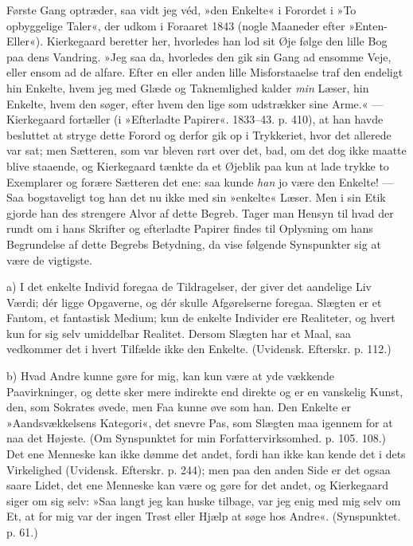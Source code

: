 \documentclass[12pt,a4paper,openany]{book}
\newcommand{\opage}[1]{\marginnote{\footnotesize\textit{[#1]}}}
\begin{document}
Første Gang optræder, saa vidt jeg véd, »den Enkelte«
i Forordet i »To opbyggelige Taler«, der udkom i Foraaret
1843 (nogle Maaneder efter »Enten-Eller«). Kierkegaard
beretter her, hvorledes han lod sit Øje følge den
lille Bog paa dens Vandring. »Jeg saa da, hvorledes
den gik sin Gang ad ensomme Veje, eller ensom ad
de alfare. Efter en eller anden lille Misforstaaelse traf
den endeligt hin Enkelte, hvem jeg med Glæde og Taknemlighed
kalder \textit{min} Læser, hin Enkelte, hvem den
søger, efter hvem den lige som udstrækker sine Arme.« ---
Kierkegaard fortæller (i »Efterladte Papirer«. 1833--43.
p. 410), at han havde besluttet at stryge dette Forord og
derfor gik op i Trykkeriet, hvor det allerede var sat;
men Sætteren, som var bleven rørt over det, bad, om det
dog ikke maatte blive staaende, og Kierkegaard tænkte
da et Øjeblik paa kun at lade trykke to Exemplarer og
forære Sætteren det ene: saa kunde \textit{han} jo være den
Enkelte! --- Saa bogstaveligt tog han det nu ikke med
sin »enkelte« Læser. Men i sin Etik gjorde han des
strengere Alvor af dette Begreb. Tager man Hensyn til
hvad der rundt om i hans Skrifter og efterladte Papirer
findes til Oplysning om hans Begrundelse af dette Begrebs
Betydning, da vise følgende Synspunkter sig at
være de vigtigste.

a) I det enkelte Individ foregaa de Tildragelser,
der giver det aandelige Liv Værdi; dér ligge Opgaverne,
og dér skulle Afgørelserne foregaa. Slægten er et Fantom,
et fantastisk Medium; kun de enkelte Individer ere
\opage{100}Realiteter, og hvert kun for sig selv umiddelbar Realitet.
Dersom Slægten har et Maal, saa vedkommer det i hvert
Tilfælde ikke den Enkelte. (Uvidensk. Efterskr. p. 112.)

b) Hvad Andre kunne gøre for mig, kan kun være
at yde vækkende Paavirkninger, og dette sker mere indirekte
end direkte og er en vanskelig Kunst, den, som
Sokrates øvede, men Faa kunne øve som han. Den Enkelte
er »Aandsvækkelsens Kategori«, det snevre Pas, som
Slægten maa igennem for at naa det Højeste. (Om Synspunktet
for min Forfattervirksomhed. p. 105. 108.) Det
ene Menneske kan ikke dømme det andet, fordi han ikke
kan kende det i dets Virkelighed (Uvidensk. Efterskr.
p. 244); men paa den anden Side er det ogsaa saare
Lidet, det ene Menneske kan være og gøre for det andet,
og Kierkegaard siger om sig selv: »Saa langt jeg kan
huske tilbage, var jeg enig med mig selv om Et, at for
mig var der ingen Trøst eller Hjælp at søge hos Andre«.
(Synspunktet. p. 61.)
\end{document}

